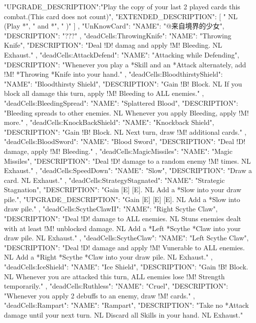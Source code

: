 {{    "UPGRADE_DESCRIPTION":"Play the copy of your last 2 played cards this combat.(This card does not count)",
    "EXTENDED_DESCRIPTION": [
      " NL (Play *",
      " and *",
      " )"
    ]
  },
  "UnKnowCard": {
    "NAME": "@来自境界的少女",
    "DESCRIPTION": "???"
  },
  "deadCells:ThrowingKnife": {
    "NAME": "Throwing Knife",
    "DESCRIPTION": "Deal !D! damag and apply !M! Bleeding. NL Exhaust."
  },
  "deadCells:AttackDefend": {
    "NAME": "Attacking while Defending",
    "DESCRIPTION": "Whenever you play a *Skill and an *Attack alternately, add !M! *Throwing *Knife into your hand."
  },
  "deadCells:BloodthirstyShield": {
    "NAME": "Bloodthirsty Shield",
    "DESCRIPTION": "Gain !B! Block. NL If you block all damage this turn, apply !M! Bleeding to ALL enemies."
  },
  "deadCells:BleedingSpread": {
    "NAME": "Splattered Blood",
    "DESCRIPTION": "Bleeding spreads to other enemies. NL Whenever you apply Bleeding, apply !M! more."
  },
  "deadCells:KnockBackShield":{
    "NAME": "Knockback Shield",
    "DESCRIPTION": "Gain !B! Block. NL Next turn, draw !M! additional cards."
  },
  "deadCells:BloodSword": {
    "NAME": "Blood Sword",
    "DESCRIPTION": "Deal !D! damage, apply !M! Bleeding."
  },
  "deadCells:MagicMissiles": {
    "NAME": "Magic Missiles",
    "DESCRIPTION": "Deal !D! damage to a random enemy !M! times. NL Exhaust."
  },
  "deadCells:SpeedDown": {
    "NAME": "Slow",
    "DESCRIPTION": "Draw a card. NL Exhaust."
  },
  "deadCells:StrategyStagnated":{
    "NAME": "Strategic Stagnation",
    "DESCRIPTION": "Gain [E] [E]. NL Add a *Slow into your draw pile.",
    "UPGRADE_DESCRIPTION": "Gain [E] [E] [E]. NL Add a *Slow into draw pile."
  },
  "deadCells:ScytheClawII": {
    "NAME": "Right Scythe Claw",
    "DESCRIPTION": "Deal !D! damage to ALL enemies. NL Stuns enemies dealt with at least !M! unblocked damage. NL Add a *Left *Scythe *Claw into your draw pile. NL Exhaust."
  },
  "deadCells:ScytheClaw": {
    "NAME": "Left Scythe Claw",
    "DESCRIPTION": "Deal !D! damage and apply !M! Vunerable to ALL enemies. NL Add a *Right *Scythe *Claw into your draw pile. NL Exhaust."
  },
  "deadCells:IceShield": {
    "NAME": "Ice Shield",
    "DESCRIPTION": "Gain !B! Block. NL Whenever you are attacked this turn, ALL enemies lose !M! Strength temporarily."
  },
  "deadCells:Ruthless": {
    "NAME": "Cruel",
    "DESCRIPTION": "Whenever you apply 2 debuffs to an enemy, draw !M! cards."
  },
  "deadCells:Rampart": {
    "NAME": "Rampart",
    "DESCRIPTION": "Take no *Attack damage until your next turn. NL Discard all Skills in your hand. NL Exhaust."
}}
